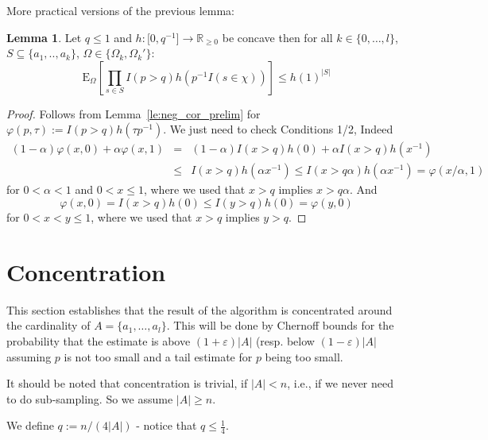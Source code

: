 \documentclass{article}
\newcommand{\expectation}{\mathrm{E}}
\newcommand{\eps}{\varepsilon}
\renewcommand{\phi}{\varphi}
\theoremstyle{definition}
\newtheorem{lemma}{Lemma}
\begin{document}
More practical versions of the previous lemma:
\begin{lemma}\label{le:neg_cor_neg}
Let $q \leq 1$ and $h : \mathbb [0,q^{-1}] \rightarrow \mathbb R_{\geq 0}$ be concave then for all 
$k \in \{0,\ldots,l\}$, $S \subseteq \{a_1,..,a_k\}$, $\Omega \in \{\Omega_k,\Omega_k'\}$:
\[
  \expectation_{\Omega}\left[ \prod_{s \in S} I(p > q) h(p^{-1} I(s \in \chi)) \right] \leq h(1)^{|S|} 
\]
\end{lemma}
\begin{proof}
Follows from Lemma~\ref{le:neg_cor_prelim} for $\phi(p,\tau) := I(p > q) h(\tau p^{-1})$. We just need to check Conditions 1/2, Indeed
\begin{eqnarray*}
  (1-\alpha) \phi(x,0) + \alpha \phi(x,1) & = & (1-\alpha) I(x>q) h(0) + \alpha I(x > q) h(x^{-1}) \\
   & \leq & I(x > q) h(\alpha x^{-1}) \leq I(x > q \alpha) h(\alpha x^{-1}) = \phi(x/\alpha,1)
\end{eqnarray*}
for $0 < \alpha < 1$ and $0< x \leq 1$, where we used that $x > q$ implies $x > q \alpha$. And
\[
  \phi(x,0) = I(x>q) h(0) \leq I(y > q) h(0) = \phi(y,0)
\]
for $0 < x < y \leq 1$, where we used that $x > q$ implies $y > q$.
\end{proof}

\section{Concentration}
This section establishes that the result of the algorithm is concentrated around the cardinality of $A = \{ a_1, \ldots, a_l \}$. This will be done by Chernoff bounds for the probability that the estimate is above $(1+\eps)|A|$ (resp. below $(1-\eps)|A|$ assuming $p$ is not too small and a tail estimate for $p$ being too small.

It should be noted that concentration is trivial, if $|A| < n$, i.e., if we never need to do sub-sampling.
So we assume $|A| \geq n$.

We define $q := n/(4|A|)$ - notice that $q \leq \frac{1}{4}$. 
\end{document}
